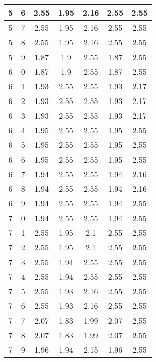 \begin{longtable}{|c|c||c||c|c||c|c|}
	5 & 6 & 2.55 & 1.95 & 2.16 & 2.55 & 2.55 \\ \hline
	5 & 7 & 2.55 & 1.95 & 2.16 & 2.55 & 2.55 \\ \hline
	5 & 8 & 2.55 & 1.95 & 2.16 & 2.55 & 2.55 \\ \hline
	5 & 9 & 1.87 & 1.9 & 2.55 & 1.87 & 2.55 \\ \hline
	6 & 0 & 1.87 & 1.9 & 2.55 & 1.87 & 2.55 \\ \hline
	6 & 1 & 1.93 & 2.55 & 2.55 & 1.93 & 2.17 \\ \hline
	6 & 2 & 1.93 & 2.55 & 2.55 & 1.93 & 2.17 \\ \hline
	6 & 3 & 1.93 & 2.55 & 2.55 & 1.93 & 2.17 \\ \hline
	6 & 4 & 1.95 & 2.55 & 2.55 & 1.95 & 2.55 \\ \hline
	6 & 5 & 1.95 & 2.55 & 2.55 & 1.95 & 2.55 \\ \hline
	6 & 6 & 1.95 & 2.55 & 2.55 & 1.95 & 2.55 \\ \hline
	6 & 7 & 1.94 & 2.55 & 2.55 & 1.94 & 2.16 \\ \hline
	6 & 8 & 1.94 & 2.55 & 2.55 & 1.94 & 2.16 \\ \hline
	6 & 9 & 1.94 & 2.55 & 2.55 & 1.94 & 2.55 \\ \hline
	7 & 0 & 1.94 & 2.55 & 2.55 & 1.94 & 2.55 \\ \hline
	7 & 1 & 2.55 & 1.95 & 2.1 & 2.55 & 2.55 \\ \hline
	7 & 2 & 2.55 & 1.95 & 2.1 & 2.55 & 2.55 \\ \hline
	7 & 3 & 2.55 & 1.94 & 2.55 & 2.55 & 2.55 \\ \hline
	7 & 4 & 2.55 & 1.94 & 2.55 & 2.55 & 2.55 \\ \hline
	7 & 5 & 2.55 & 1.93 & 2.16 & 2.55 & 2.55 \\ \hline
	7 & 6 & 2.55 & 1.93 & 2.16 & 2.55 & 2.55 \\ \hline
	7 & 7 & 2.07 & 1.83 & 1.99 & 2.07 & 2.55 \\ \hline
	7 & 8 & 2.07 & 1.83 & 1.99 & 2.07 & 2.55 \\ \hline
	7 & 9 & 1.96 & 1.94 & 2.15 & 1.96 & 2.55 \\ \hline
\end{longtable}

